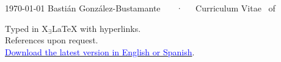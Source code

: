 \documentclass[11pt, a4paper]{bgonzalezbustamante-style}
\begin{document}
\makecvheader

\makecvfooter
  {\today}
  {Bastián González-Bustamante ~~~·~~~Curriculum Vitae}
  {\thepage\ of \pageref*{LastPage}}





















\vspace{10mm}
\raggedleft
{\footnotesize Typed in {\small X$_{\exists}${\LaTeX}} with hyperlinks.}\\
{\footnotesize References upon request.}\\
{\footnotesize \textcolor{oxfordblue}{\normalsize \faGithub} \href{https://bgonzalezbustamante.github.io/CV-XeLaTeX/}{\textcolor{blue}{Download the latest version in English or Spanish}}.}
\end{document}
